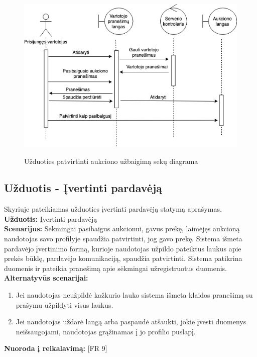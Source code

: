 \documentclass{VUMIFPSkursinis}
\begin{document}
			\begin{figure}[H]
		\centering
		\includegraphics[width=\linewidth]{img/finishAuctionSequence.png}
		\label{fig:takebet}
		\caption{Užduoties patvirtinti aukciono užbaigimą sekų diagrama}
	\end{figure}

	\subsection{Užduotis - Įvertinti pardavėją}
	Skyriuje pateikiamas užduoties įvertinti pardavėją statymą aprašymas.\\
	\textbf{Užduotis:}  Įvertinti pardavėją \\
	\textbf{Scenarijus:}  Sėkmingai pasibaigus aukcionui, gavus prekę, laimėjęs aukcioną naudotojas savo profilyje spaudžia patvirtinti, jog gavo prekę. Sistema išmeta pardavėjo įvertinimo formą, kurioje naudotojas užpildo pateiktus laukus apie prekės būklę, pardavėjo komunikaciją, spaudžia patvirtinti. Sistema patikrina duomenis ir pateikia pranešimą apie sėkmingai užregistruotus duomenis. \\
	\textbf{Alternatyvūs scenarijai:}
	\begin{enumerate}
		\item Jei naudotojas neužpildė kažkurio lauko sistema išmeta klaidos pranešimą su prašymu užpildyti visus laukus.
		\item Jei naudotojas uždarė langą arba paspaudė atšaukti, jokie įvesti duomenys neišsaugojami, naudotojas grąžinamas į jo profilio puslapį.
	\end{enumerate}
	\textbf{Nuoroda į reikalavimą: } [FR 9]
	
\end{document}
